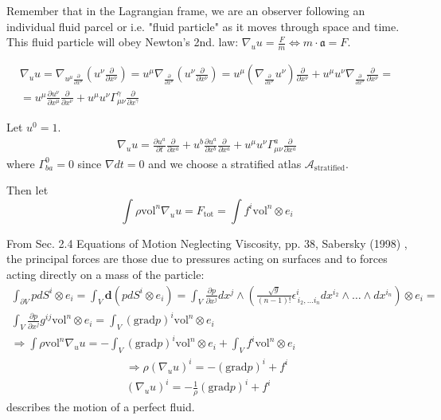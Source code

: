\documentclass[twoside,landscape,10pt]{amsart}
\theoremstyle{plain}
\theoremstyle{definition}
\theoremstyle{remark}
\theoremstyle{remark}
\begin{document}
\begin{multicols*}{2}
Remember that in the Lagrangian frame, we are an observer following an individual fluid parcel or i.e. "fluid particle" as it moves through space and time. This fluid particle will obey Newton's 2nd. law: $\nabla_{u} u = \frac{F}{m} \Longleftrightarrow m \cdot \mathfrak{a} = F$. 

\[
\begin{gathered}
\nabla_u u = \nabla_{u^{\mu}\frac{\partial}{\partial x^{\mu}}} (u^{\nu} \frac{\partial}{\partial x^{\nu}}) = u^{\mu} \nabla_{\frac{ \partial }{\partial x^{\mu}} } (u^{\nu} \frac{ \partial }{ \partial x^{\nu}}) =  u^{\mu} \left( \nabla_{\frac{ \partial }{\partial x^{\mu}} } u^{\nu} \right) \frac{ \partial }{ \partial x^{\nu}} + u^{\mu} u^{\nu} \nabla_{\frac{ \partial }{\partial x^{\mu}} }  \frac{ \partial }{ \partial x^{\nu}} = \\
= u^{\mu} \frac{ \partial u^{\nu} }{ \partial x^{\mu}} \frac{\partial}{\partial x^{\nu}} + u^{\mu}u^{\nu} \Gamma^{\gamma}_{\mu \nu} \frac{\partial}{\partial x^{\gamma}}
\end{gathered}
\]

Let $u^0 = 1$.
\[
\begin{gathered}
\nabla_u u = \frac{\partial u^a}{\partial t} \frac{\partial }{ \partial x^a} + u^b \frac{\partial u^a}{\partial x^b} \frac{\partial}{\partial x^a} + u^{\mu} u^{\nu} \Gamma^a_{\mu \nu} \frac{\partial}{\partial x^a}
\end{gathered}
\]
where $\Gamma^0_{ba} = 0$ since $\nabla dt =0$ and we choose a stratified atlas $\mathcal{A}_{\text{stratified}}$.

Then let
\[
\int \rho \text{vol}^n \nabla_u u = F_{\text{tot}}  = \int f^i \text{vol}^n \otimes e_i
\]

From Sec. 2.4 Equations of Motion Neglecting Viscosity, pp. 38, Sabersky (1998) \cite{SAHG1998}, the principal forces are those due to pressures acting on surfaces and to forces acting directly on a mass of the particle:
\[
\begin{gathered}
\int_{\partial V} p dS^i \otimes e_i = \int_V \mathbf{d} (pdS^i \otimes e_i) = \int_V \frac{\partial p}{\partial x^j} dx^j \wedge \left( \frac{\sqrt{g}}{(n-1)!} \epsilon^i_{\, i_2, \dots i_n} dx^{i_2} \wedge \dots \wedge dx^{i_n} \right) \otimes e_i = \\
\int_V \frac{\partial p}{\partial x^j} g^{ij} \text{vol}^n \otimes e_i = \int_V (\text{grad}p)^i \text{vol}^n \otimes e_i \\
\Longrightarrow \int \rho \text{vol}^n \nabla_u u = -\int_V (\text{grad}p)^i \text{vol}^n \otimes e_i + \int_V f^i \text{vol}^n \otimes e_i
\end{gathered}
\]
\begin{equation}\label{Eq:EulerianEquationMomentumConservationFluidFlow}
\begin{gathered}
\Longrightarrow \rho (\nabla_u u)^i = -(\text{grad}p)^i + f^i \\
(\nabla_u u)^i = -\frac{1}{\rho} (\text{grad}p)^i + f^i
\end{gathered}
\end{equation}
describes the motion of a perfect fluid.


\end{multicols*}
\end{document}
